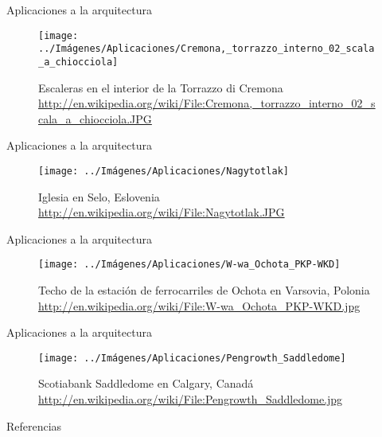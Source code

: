 \documentclass[10pt]{beamer}
\begin{document}
	\begin{frame}{Aplicaciones a la arquitectura}	
		\begin{figure}
			\centering
			\texttt{[image: ../Imágenes/Aplicaciones/Cremona,\_torrazzo\_interno\_02\_scala\_a\_chiocciola]}
			\caption{Escaleras en el interior de la Torrazzo di Cremona
			\url{http://en.wikipedia.org/wiki/File:Cremona,_torrazzo_interno_02_scala_a_chiocciola.JPG}}
			\label{fig:italia}
		\end{figure}	
	\end{frame}
	
	\begin{frame}{Aplicaciones a la arquitectura}	
		\begin{figure}
			\centering
			\texttt{[image: ../Imágenes/Aplicaciones/Nagytotlak]}
			\caption{Iglesia en Selo, Eslovenia
			\url{http://en.wikipedia.org/wiki/File:Nagytotlak.JPG}}
			\label{fig:eslovenia}
		\end{figure}	
	\end{frame}
	
	\begin{frame}{Aplicaciones a la arquitectura}	
		\begin{figure}
			\centering
			\texttt{[image: ../Imágenes/Aplicaciones/W-wa\_Ochota\_PKP-WKD]}
			\caption{Techo de la estación de ferrocarriles de Ochota en Varsovia, Polonia
				\url{http://en.wikipedia.org/wiki/File:W-wa_Ochota_PKP-WKD.jpg}}
			\label{fig:trenes}
		\end{figure}	
	\end{frame}
	
	\begin{frame}{Aplicaciones a la arquitectura}	
		\begin{figure}
			\centering
			\texttt{[image: ../Imágenes/Aplicaciones/Pengrowth\_Saddledome]}
			\caption{Scotiabank Saddledome en Calgary, Canadá
				\url{http://en.wikipedia.org/wiki/File:Pengrowth_Saddledome.jpg}}
			\label{fig:canada}
		\end{figure}	
	\end{frame}
	
	\begin{frame}{Referencias}
	\end{frame}
	
\end{document}
